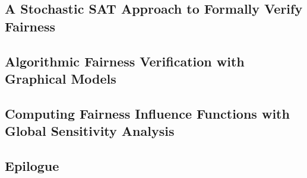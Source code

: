 \begin{mainmatter}
	\chapter{A Stochastic SAT Approach to Formally Verify Fairness}
	
	
	
	
	

	\chapter{Algorithmic Fairness Verification with Graphical Models}
	
	
	
	
	
	
					
	\chapter{Computing Fairness Influence Functions with Global Sensitivity Analysis}				
	
	
	
	
		

	
	
\end{mainmatter}


\begin{backmatter}
	\part{Epilogue}
	
	\printbibliography[heading=bibintoc]
\end{backmatter}

\appendix


